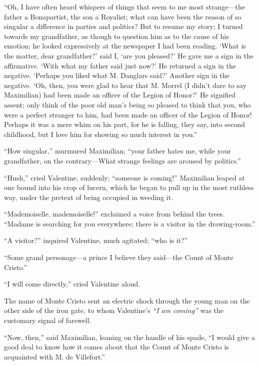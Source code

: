 “Oh, I have often heard whispers of things that seem to me most
strange—the father a Bonapartist, the son a Royalist; what can have
been the reason of so singular a difference in parties and politics?
But to resume my story; I turned towards my grandfather, as though to
question him as to the cause of his emotion; he looked expressively at
the newspaper I had been reading. ‘What is the matter, dear
grandfather?’ said I, ‘are you pleased?’ He gave me a sign in the
affirmative. ‘With what my father said just now?’ He returned a sign in
the negative. ‘Perhaps you liked what M. Danglars said?’ Another sign
in the negative. ‘Oh, then, you were glad to hear that M. Morrel (I
didn’t dare to say Maximilian) had been made an officer of the Legion
of Honor?’ He signified assent; only think of the poor old man’s being
so pleased to think that you, who were a perfect stranger to him, had
been made an officer of the Legion of Honor! Perhaps it was a mere whim
on his part, for he is falling, they say, into second childhood, but I
love him for showing so much interest in you.”

“How singular,” murmured Maximilian; “your father hates me, while your
grandfather, on the contrary—What strange feelings are aroused by
politics.”

“Hush,” cried Valentine, suddenly; “someone is coming!” Maximilian
leaped at one bound into his crop of lucern, which he began to pull up
in the most ruthless way, under the pretext of being occupied in
weeding it.

“Mademoiselle, mademoiselle!” exclaimed a voice from behind the trees.
“Madame is searching for you everywhere; there is a visitor in the
drawing-room.”

“A visitor?” inquired Valentine, much agitated; “who is it?”

“Some grand personage—a prince I believe they said—the Count of Monte
Cristo.”

“I will come directly,” cried Valentine aloud.

The name of Monte Cristo sent an electric shock through the young man
on the other side of the iron gate, to whom Valentine’s \textit{“I am coming”}
was the customary signal of farewell.

“Now, then,” said Maximilian, leaning on the handle of his spade, “I
would give a good deal to know how it comes about that the Count of
Monte Cristo is acquainted with M. de Villefort.”

